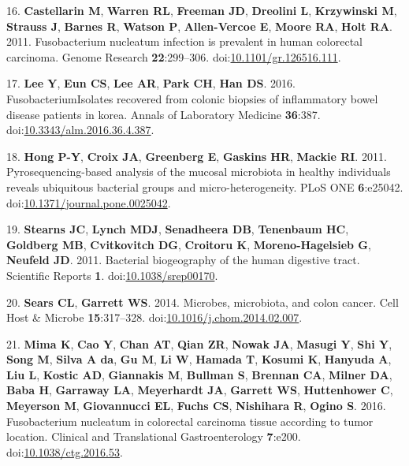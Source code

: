 \documentclass[11pt,]{article}
\begin{document}
\hypertarget{ref-Castellarin2011}{}
16. \textbf{Castellarin M}, \textbf{Warren RL}, \textbf{Freeman JD},
\textbf{Dreolini L}, \textbf{Krzywinski M}, \textbf{Strauss J},
\textbf{Barnes R}, \textbf{Watson P}, \textbf{Allen-Vercoe E},
\textbf{Moore RA}, \textbf{Holt RA}. 2011. Fusobacterium nucleatum
infection is prevalent in human colorectal carcinoma. Genome Research
\textbf{22}:299--306.
doi:\href{https://doi.org/10.1101/gr.126516.111}{10.1101/gr.126516.111}.

\hypertarget{ref-Lee2016}{}
17. \textbf{Lee Y}, \textbf{Eun CS}, \textbf{Lee AR}, \textbf{Park CH},
\textbf{Han DS}. 2016. FusobacteriumIsolates recovered from colonic
biopsies of inflammatory bowel disease patients in korea. Annals of
Laboratory Medicine \textbf{36}:387.
doi:\href{https://doi.org/10.3343/alm.2016.36.4.387}{10.3343/alm.2016.36.4.387}.

\hypertarget{ref-Hong2011}{}
18. \textbf{Hong P-Y}, \textbf{Croix JA}, \textbf{Greenberg E},
\textbf{Gaskins HR}, \textbf{Mackie RI}. 2011. Pyrosequencing-based
analysis of the mucosal microbiota in healthy individuals reveals
ubiquitous bacterial groups and micro-heterogeneity. PLoS ONE
\textbf{6}:e25042.
doi:\href{https://doi.org/10.1371/journal.pone.0025042}{10.1371/journal.pone.0025042}.

\hypertarget{ref-Stearns2011}{}
19. \textbf{Stearns JC}, \textbf{Lynch MDJ}, \textbf{Senadheera DB},
\textbf{Tenenbaum HC}, \textbf{Goldberg MB}, \textbf{Cvitkovitch DG},
\textbf{Croitoru K}, \textbf{Moreno-Hagelsieb G}, \textbf{Neufeld JD}.
2011. Bacterial biogeography of the human digestive tract. Scientific
Reports \textbf{1}.
doi:\href{https://doi.org/10.1038/srep00170}{10.1038/srep00170}.

\hypertarget{ref-Sears2014}{}
20. \textbf{Sears CL}, \textbf{Garrett WS}. 2014. Microbes, microbiota,
and colon cancer. Cell Host \& Microbe \textbf{15}:317--328.
doi:\href{https://doi.org/10.1016/j.chom.2014.02.007}{10.1016/j.chom.2014.02.007}.

\hypertarget{ref-Mima2016}{}
21. \textbf{Mima K}, \textbf{Cao Y}, \textbf{Chan AT}, \textbf{Qian ZR},
\textbf{Nowak JA}, \textbf{Masugi Y}, \textbf{Shi Y}, \textbf{Song M},
\textbf{Silva A da}, \textbf{Gu M}, \textbf{Li W}, \textbf{Hamada T},
\textbf{Kosumi K}, \textbf{Hanyuda A}, \textbf{Liu L}, \textbf{Kostic
AD}, \textbf{Giannakis M}, \textbf{Bullman S}, \textbf{Brennan CA},
\textbf{Milner DA}, \textbf{Baba H}, \textbf{Garraway LA},
\textbf{Meyerhardt JA}, \textbf{Garrett WS}, \textbf{Huttenhower C},
\textbf{Meyerson M}, \textbf{Giovannucci EL}, \textbf{Fuchs CS},
\textbf{Nishihara R}, \textbf{Ogino S}. 2016. Fusobacterium nucleatum in
colorectal carcinoma tissue according to tumor location. Clinical and
Translational Gastroenterology \textbf{7}:e200.
doi:\href{https://doi.org/10.1038/ctg.2016.53}{10.1038/ctg.2016.53}.
\end{document}
